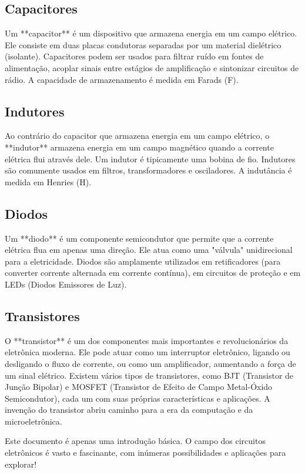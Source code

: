 \documentclass{article}
\begin{document}
\subsection*{Capacitores}
Um **capacitor** é um dispositivo que armazena energia em um campo elétrico. Ele consiste em duas placas condutoras separadas por um material dielétrico (isolante). Capacitores podem ser usados para filtrar ruído em fontes de alimentação, acoplar sinais entre estágios de amplificação e sintonizar circuitos de rádio. A capacidade de armazenamento é medida em Farads (F).

\newpage %

\subsection*{Indutores}
Ao contrário do capacitor que armazena energia em um campo elétrico, o **indutor** armazena energia em um campo magnético quando a corrente elétrica flui através dele. Um indutor é tipicamente uma bobina de fio. Indutores são comumente usados em filtros, transformadores e osciladores. A indutância é medida em Henries (H).

\subsection*{Diodos}
Um **diodo** é um componente semicondutor que permite que a corrente elétrica flua em apenas uma direção. Ele atua como uma "válvula" unidirecional para a eletricidade. Diodos são amplamente utilizados em retificadores (para converter corrente alternada em corrente contínua), em circuitos de proteção e em LEDs (Diodos Emissores de Luz).

\subsection*{Transistores}
O **transistor** é um dos componentes mais importantes e revolucionários da eletrônica moderna. Ele pode atuar como um interruptor eletrônico, ligando ou desligando o fluxo de corrente, ou como um amplificador, aumentando a força de um sinal elétrico. Existem vários tipos de transistores, como BJT (Transistor de Junção Bipolar) e MOSFET (Transistor de Efeito de Campo Metal-Óxido Semicondutor), cada um com suas próprias características e aplicações. A invenção do transistor abriu caminho para a era da computação e da microeletrônica.

Este documento é apenas uma introdução básica. O campo dos circuitos eletrônicos é vasto e fascinante, com inúmeras possibilidades e aplicações para explorar!
\end{document}
